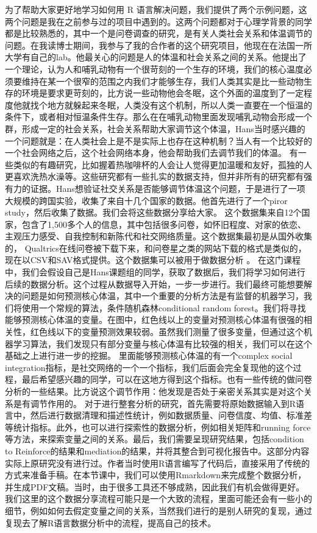 \documentclass[
  oneside]{book}
\begin{document}
为了帮助大家更好地学习如何用 R 语言解决问题，我们提供了两个示例问题，这两个问题是我在之前参与过的项目中遇到的。这两个问题都对于心理学背景的同学都是比较熟悉的，其中一个是问卷调查的研究，是有关人类社会关系和体温调节的问题。在我读博士期间，我参与了我的合作者的这个研究项目，他现在在法国一所大学有自己的lab。他最关心的问题是人的体温和社会关系之间的关系。他提出了一个理论，认为人和哺乳动物有一个很苛刻的一个生存的环境，我们的核心温度必须要维持在某一个很窄的范围之内我们才能够生存，我们人类其实是比一些动物生存的环境是要求更苛刻的，比方说一些动物他会冬眠，这个外面的温度到了一定程度他就找个地方就躲起来冬眠，人类没有这个机制，所以人类一直要在一个恒温的条件下，或者相对恒温条件生存。那么在在哺乳动物里面发现哺乳动物会形成一个群，形成一定的社会关系，社会关系帮助大家调节这个体温，Hans当时感兴趣的一个问题就是：在人类社会上是不是实际上也存在这种机制？当人有一个比较好的一个社会网络之后，这个社会网络本身，他会帮助我们去调节我们的体温。
有一些类似的有趣研究，比如握着热咖啡杯的人会让人觉得更加温暖和友好，孤独的人更喜欢洗热水澡等。这些研究都有一些扎实的数据支持，但并非所有的研究都有强有力的证据。Hans想验证社交关系是否能够调节体温这个问题，于是进行了一项大规模的跨国实验，收集了来自十几个国家的数据。他首先进行了一个piror study，然后收集了数据。我们会将这些数据分享给大家。
这个数据集来自12个国家，包含了1,500多个人的信息，其中包括很多问卷，如怀旧程度、对家的依恋、主观压力感受、自我控制和新陈代和社交网络质量。这个数据集最初是从国外收集的， Qualtrics在线问卷被下载下来，和问卷星之类的网站下载的格式是类似的，现在以CSV和SAV格式提供。这个数据集可以被用于做数据分析 。
在这门课程中，我们会假设自己是Hans课题组的同学，获取了数据后，我们将学习如何进行后续的数据分析。这个过程从数据导入开始，一步一步进行。我们最终可能想要解决的问题是如何预测核心体温，其中一个重要的分析方法是有监督的机器学习，我们将使用一个常规的算法，条件随机森林conditional random forest。我们将寻找能够预测核心体温的变量。在图中，红色线以上的变量对预测核心体温有很强的相关性，红色线以下的变量预测效果较弱。虽然我们测量了很多变量，但通过这个机器学习算法，我们发现只有部分变量与核心体温有比较强的相关，我们可以在这个基础之上进行进一步的挖掘。
里面能够预测核心体温的有一个complex social integration指标，是社交网络的一个一个指标，我们后面会完全复现他的这个过程，最后希望感兴趣的同学，可以在这地方得到这个指标。也有一些传统的做问卷分析的一些结果。比方说这个调节作用：他发现是否处于亲密关系其实是对这个关系是有调节作用的。
对于进行整套分析的研究，首先需要将原始数据输入到R语言中，然后进行数据清理和描述性统计，例如数据质量、问卷信度、均值、标准差等统计指标。此外，也可以进行探索性的数据分析，例如相关矩阵和running force等方法，来探索变量之间的关系。最后，我们需要呈现研究结果，包括condition to Reinforce的结果和mediation的结果，并将其整合到可视化报告中。这部分内容实际上原研究没有进行过。作者当时使用R语言编写了代码后，直接采用了传统的方式来准备手稿。在本节课中，我们可以使用Rmarkdown来完成整个数据分析，并生成PDF文稿。当时，由于很多工具还不够成熟，因此我们有机会做得更好。
我们这里的这个数据分享流程可能只是一个大致的流程，里面可能还会有一些小的细节，例如如何去假定变量之间的关系，当然我们进行的是别人研究的复现，通过复现去了解R语言数据分析中的流程，提高自己的技术。
\end{document}
